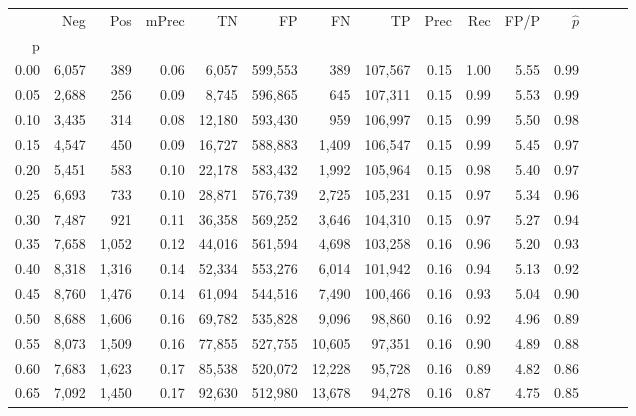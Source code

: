 \begin{tabular}{rrrrrrrrrrrrrrr}
\toprule
{} &      Neg &     Pos & mPrec &       TN &       FP &       FN &       TP &  Prec &   Rec &  FP/P & $\hat{p}$ \\
p    &          &         &       &          &          &          &          &       &       &       &           \\
\midrule
0.00 &    6,057 &     389 &  0.06 &    6,057 &  599,553 &      389 &  107,567 &  0.15 &  1.00 &  5.55 &      0.99 \\
0.05 &    2,688 &     256 &  0.09 &    8,745 &  596,865 &      645 &  107,311 &  0.15 &  0.99 &  5.53 &      0.99 \\
0.10 &    3,435 &     314 &  0.08 &   12,180 &  593,430 &      959 &  106,997 &  0.15 &  0.99 &  5.50 &      0.98 \\
0.15 &    4,547 &     450 &  0.09 &   16,727 &  588,883 &    1,409 &  106,547 &  0.15 &  0.99 &  5.45 &      0.97 \\
0.20 &    5,451 &     583 &  0.10 &   22,178 &  583,432 &    1,992 &  105,964 &  0.15 &  0.98 &  5.40 &      0.97 \\
0.25 &    6,693 &     733 &  0.10 &   28,871 &  576,739 &    2,725 &  105,231 &  0.15 &  0.97 &  5.34 &      0.96 \\
0.30 &    7,487 &     921 &  0.11 &   36,358 &  569,252 &    3,646 &  104,310 &  0.15 &  0.97 &  5.27 &      0.94 \\
0.35 &    7,658 &   1,052 &  0.12 &   44,016 &  561,594 &    4,698 &  103,258 &  0.16 &  0.96 &  5.20 &      0.93 \\
0.40 &    8,318 &   1,316 &  0.14 &   52,334 &  553,276 &    6,014 &  101,942 &  0.16 &  0.94 &  5.13 &      0.92 \\
0.45 &    8,760 &   1,476 &  0.14 &   61,094 &  544,516 &    7,490 &  100,466 &  0.16 &  0.93 &  5.04 &      0.90 \\
0.50 &    8,688 &   1,606 &  0.16 &   69,782 &  535,828 &    9,096 &   98,860 &  0.16 &  0.92 &  4.96 &      0.89 \\
0.55 &    8,073 &   1,509 &  0.16 &   77,855 &  527,755 &   10,605 &   97,351 &  0.16 &  0.90 &  4.89 &      0.88 \\
0.60 &    7,683 &   1,623 &  0.17 &   85,538 &  520,072 &   12,228 &   95,728 &  0.16 &  0.89 &  4.82 &      0.86 \\
0.65 &    7,092 &   1,450 &  0.17 &   92,630 &  512,980 &   13,678 &   94,278 &  0.16 &  0.87 &  4.75 &      0.85 \\

\end{tabular}
